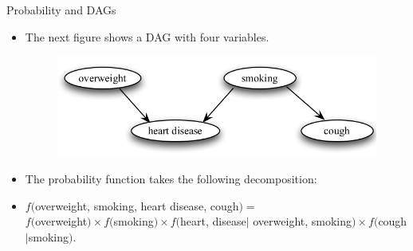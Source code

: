 \documentclass[handout]{beamer}
\begin{document}
\begin{frame}{Probability and DAGs}
\scriptsize{
\begin{itemize}


\item The next figure shows a DAG with four variables.

\begin{figure}[h!]
	\centering
	\includegraphics[scale=0.4]{pics/dag3.png}
	\end{figure} 



\item The probability function takes the following decomposition:

\item $f($overweight, smoking, heart disease, cough$) =$ \\    $f($overweight$) \times f($smoking$) \times f($heart, disease$|$ overweight, smoking$) \times f($cough$|$smoking$)$. 


\end{itemize}



} 

\end{frame}
\end{document}
